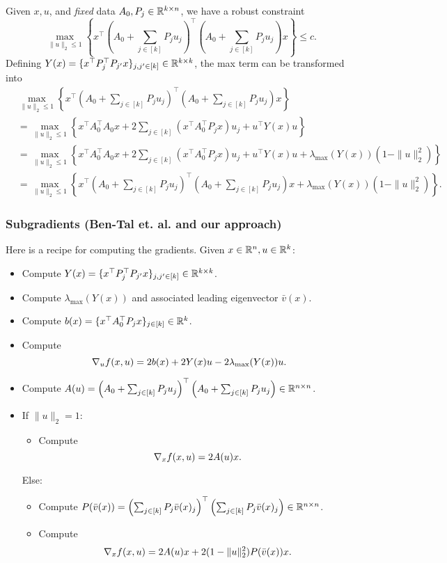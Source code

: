 \documentclass[11pt,oneside]{article}
\theoremstyle{plain}
\theoremstyle{definition}
\theoremstyle{remark}
\begin{document}
Given $x,u$, and \emph{fixed} data $A_0, P_j \in \mathbb{R}^{k \times n}$, we have a robust constraint
\[ \max_{\|u\|_2 \leq 1} \left\{ x^\top \left( A_0 + \sum_{j \in [k]} P_j u_j \right)^\top \left( A_0 + \sum_{j \in [k]} P_j u_j \right) x \right\} \leq c. \]
Defining $Y(x) = \{x^\top P_j^\top P_{j'} x\}_{j,j' \in [k]} \in \mathbb{R}^{k \times k}$, the max term can be transformed into 
\begin{align*}
&\max_{\|u\|_2 \leq 1} \left\{ x^\top \left( A_0 + \sum_{j \in [k]} P_j u_j \right)^\top \left( A_0 + \sum_{j \in [k]} P_j u_j \right) x \right\}\\
&= \max_{\|u\|_2 \leq 1} \left\{ x^\top A_0^\top A_0 x + 2 \sum_{j \in [k]} (x^\top A_0^\top P_j x) u_j + u^\top Y(x) u \right\}\\
&= \max_{\|u\|_2 \leq 1} \left\{ x^\top A_0^\top A_0 x + 2 \sum_{j \in [k]} (x^\top A_0^\top P_j x) u_j + u^\top Y(x) u + \lambda_{\max}(Y(x))(1 - \|u\|_2^2) \right\}\\
&= \max_{\|u\|_2 \leq 1} \left\{ x^\top \left( A_0 + \sum_{j \in [k]} P_j u_j \right)^\top \left( A_0 + \sum_{j \in [k]} P_j u_j \right) x + \lambda_{\max}(Y(x))(1 - \|u\|_2^2) \right\}.
\end{align*}

\subsubsection{Subgradients (Ben-Tal et. al. and our approach)}
Here is a recipe for computing the gradients. Given $x \in \mathbb{R}^n, u \in \mathbb{R}^k$:
\begin{itemize}
\item Compute $Y(x) = \{x^\top P_j^\top P_{j'} x\}_{j,j' \in [k]} \in \mathbb{R}^{k \times k}$.
\item Compute $\lambda_{\max}(Y(x))$ and associated leading eigenvector $\bar{v}(x)$.
\item Compute $b(x) = \{x^\top A_0^\top P_j x\}_{j \in [k]} \in \mathbb{R}^k$.
\item Compute
\[ \nabla_u f(x,u) = 2 b(x) + 2 Y(x) u - 2 \lambda_{\max}(Y(x)) u. \]
\item Compute $A(u) = \left( A_0 + \sum_{j \in [k]} P_j u_j \right)^\top \left( A_0 + \sum_{j \in [k]} P_j u_j \right) \in \mathbb{R}^{n \times n}$.
\item If $\|u\|_2 = 1$:
\begin{itemize}
\item Compute
\[ \nabla_x f(x,u) = 2 A(u) x. \]
\end{itemize}
Else:
\begin{itemize}
\item Compute $P(\bar{v}(x)) = \left( \sum_{j \in [k]} P_j \bar{v}(x)_j \right)^\top \left( \sum_{j \in [k]} P_j \bar{v}(x)_j \right) \in \mathbb{R}^{n \times n}$.
\item Compute
\[ \nabla_x f(x,u) = 2 A(u) x + 2(1-\|u\|_2^2) P(\bar{v}(x)) x. \]
\end{itemize}
\end{itemize}
\end{document}
